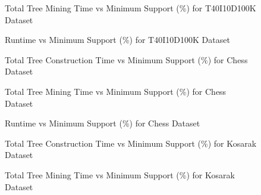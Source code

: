 \documentclass[conference]{IEEEtran}
\begin{document}
            \begin{figure}[h]
            \centering
                
            \caption{Total Tree Mining Time vs Minimum Support (\%) for T40I10D100K Dataset }
            \label{result:g_t10_mining_total}
            \end{figure}
            
            \begin{figure}[h]
            \centering
                
            \caption{Runtime vs Minimum Support (\%) for T40I10D100K Dataset }
            \label{result:g_t10_total}
            \end{figure}
    
            \begin{figure}[h]
            \centering
                
            \caption{Total Tree Construction Time vs Minimum Support (\%) for Chess Dataset }
            \label{result:g_chess_tree_construction_total}
            \end{figure}
            
            \begin{figure}[h]
            \centering
                
            \caption{Total Tree Mining Time vs Minimum Support (\%) for Chess Dataset }
            \label{result:g_chess_mining_total}
            \end{figure}
            
            \begin{figure}[h]
            \centering
                
            \caption{Runtime vs Minimum Support (\%) for Chess Dataset }
            \label{result:g_chess_total}
            \end{figure}
            \begin{figure}[h]
            \centering
                
            \caption{Total Tree Construction Time vs Minimum Support (\%) for Kosarak Dataset }
            \label{result:g_k_tree_construction_total}
            \end{figure}
            
            \begin{figure}[h]
            \centering
                
            \caption{Total Tree Mining Time vs Minimum Support (\%) for Kosarak Dataset }
            \label{result:g_k_mining_total}
            \end{figure}
\end{document}
